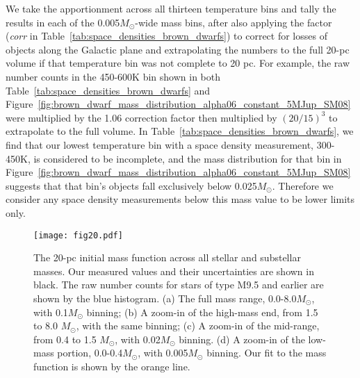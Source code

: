 \documentclass[twocolumn,tighten,twocolappendix]{aastex631}
\begin{document}
We take the apportionment across all thirteen temperature bins and tally the results in each of the 0.005$M_\odot$-wide mass bins, after also applying the factor ({\it corr} in Table~\ref{tab:space_densities_brown_dwarfs}) to correct for losses of objects along the Galactic plane and extrapolating the numbers to the full 20-pc volume if that temperature bin was not complete to 20 pc. For example, the raw number counts in the 450-600K bin shown in both Table~\ref{tab:space_densities_brown_dwarfs} and Figure~\ref{fig:brown_dwarf_mass_distribution_alpha06_constant_5MJup_SM08} were multiplied by the 1.06 correction factor then multiplied by $(20/15)^3$ to extrapolate to the full volume. In Table~\ref{tab:space_densities_brown_dwarfs}, we find that our lowest temperature bin with a space density measurement, 300-450K, is considered to be incomplete, and the mass distribution for that bin in Figure~\ref{fig:brown_dwarf_mass_distribution_alpha06_constant_5MJup_SM08} suggests that that bin's objects fall exclusively below 0.025$M_\odot$. Therefore we consider any space density measurements below this mass value to be lower limits only.

\begin{figure*}
\texttt{[image: fig20.pdf]}
\caption{The 20-pc initial mass function across all stellar and substellar masses. Our measured values and their uncertainties are shown in black. The raw number counts for stars of type M9.5 and earlier are shown by the blue histogram. (a) The full mass range, 0.0-8.0$M_\odot$, with 0.1$M_\odot$ binning; (b) A zoom-in of the high-mass end, from 1.5 to 8.0 $M_\odot$, with the same binning; (c) A zoom-in of the mid-range, from 0.4 to 1.5 $M_\odot$, with 0.02$M_\odot$ binning. (d) A zoom-in of the low-mass portion, 0.0-0.4$M_\odot$, with 0.005$M_\odot$ binning. Our fit to the mass function is shown by the orange line.
\label{fig:full_initial_mass_function}}
\end{figure*}
\end{document}

